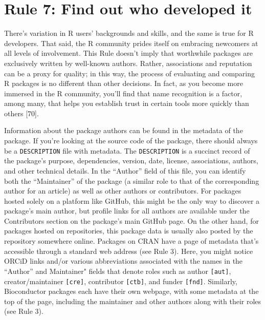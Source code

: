 \documentclass[10pt,letterpaper]{article}
\begin{document}
\hypertarget{rule-7-find-out-who-developed-it}{%
\section{Rule 7: Find out who developed
it}\label{rule-7-find-out-who-developed-it}}

There's variation in R users' backgrounds and skills, and the same is
true for R developers. That said, the R community prides itself on
embracing newcomers at all levels of involvement. This Rule doesn't
imply that worthwhile packages are exclusively written by well-known
authors. Rather, associations and reputation can be a proxy for quality;
in this way, the process of evaluating and comparing R packages is no
different than other decisions. In fact, as you become more immersed in
the R community, you'll find that name recognition is a factor, among
many, that helps you establish trust in certain tools more quickly than
others {[}70{]}.

Information about the package authors can be found in the metadata of
the package. If you're looking at the source code of the package, there
should always be a \texttt{DESCRIPTION} file with metadata. The
\texttt{DESCRIPTION} is a succinct record of the package's purpose,
dependencies, version, date, license, associations, authors, and other
technical details. In the ``Author'' field of this file, you can
identify both the ``Maintainer'' of the package (a similar role to that
of the corresponding author for an article) as well as other authors or
contributors. For packages hosted solely on a platform like GitHub, this
might be the only way to discover a package's main author, but profile
links for all authors are available under the Contributors section on
the package's main GitHub page. On the other hand, for packages hosted
on repositories, this package data is usually also posted by the
repository somewhere online. Packages on CRAN have a page of metadata
that's accessible through a standard web address (see Rule 3). Here, you
might notice ORCiD links and/or various abbreviations associated with
the names in the ``Author'' and Maintainer" fields that denote roles
such as author \texttt{{[}aut{]}}, creator/maintainer
\texttt{{[}cre{]}}, contributor \texttt{{[}ctb{]}}, and funder
\texttt{{[}fnd{]}}. Similarly, Bioconductor packages each have their own
webpage, with some metadata at the top of the page, including the
maintainer and other authors along with their roles (see Rule 3).
\end{document}
